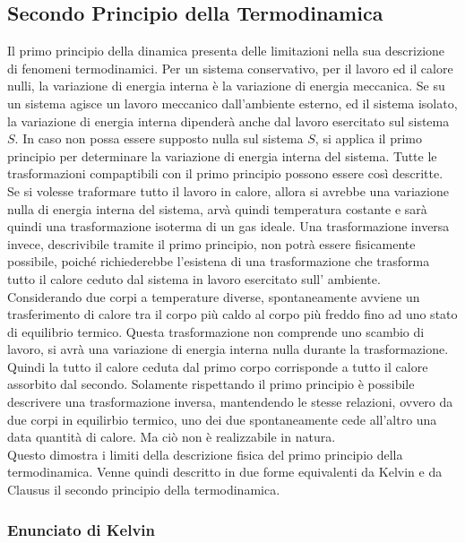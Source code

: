 \documentclass{article}
\numberwithin{equation}{subsection}
\begin{document}
\subsection{Secondo Principio della Termodinamica}
Il primo principio della dinamica presenta delle limitazioni 
nella sua descrizione di fenomeni termodinamici. Per un 
sistema conservativo, per il lavoro ed il calore nulli, 
la variazione di energia interna è la variazione di 
energia meccanica. Se su un sistema agisce un lavoro 
meccanico dall'ambiente esterno, ed il sistema isolato, 
la variazione di energia interna dipenderà anche dal 
lavoro esercitato sul sistema $S$. In caso non possa essere 
supposto nulla sul sistema $S$, si applica il primo principio 
per determinare la variazione di energia interna del sistema. 
Tutte le trasformazioni compaptibili con il primo principio 
possono essere così descritte. \\
Se si volesse traformare tutto il 
lavoro in calore, allora si avrebbe una variazione nulla di energia 
interna del sistema, arvà quindi temperatura costante e sarà 
quindi una trasformazione isoterma di un gas ideale. Una 
trasformazione inversa invece, descrivibile tramite il primo 
principio, non potrà essere fisicamente possibile, poiché 
richiederebbe l'esistena di una trasformazione che trasforma 
tutto il calore ceduto dal sistema in lavoro esercitato sull'
ambiente. \\
Considerando due corpi a temperature diverse, spontaneamente 
avviene un trasferimento di calore tra il corpo più caldo al 
corpo più freddo fino ad uno stato di equilibrio 
termico. Questa trasformazione non comprende uno 
scambio di lavoro, si avrà una variazione di energia 
interna nulla durante la trasformazione. Quindi la tutto 
il calore ceduta dal primo corpo corrisponde a tutto il 
calore assorbito dal secondo. Solamente rispettando il primo 
principio è possibile descrivere una trasformazione 
inversa, mantendendo le stesse relazioni, ovvero da due 
corpi in equilirbio termico, uno dei due spontaneamente cede 
all'altro una data quantità di calore. Ma ciò non è 
realizzabile in natura.\\
Questo dimostra i limiti della descrizione fisica del 
primo principio della termodinamica. Venne quindi 
descritto in due forme equivalenti da Kelvin e da Clausus 
il secondo principio della termodinamica. 

\subsubsection{Enunciato di Kelvin}
\end{document}
